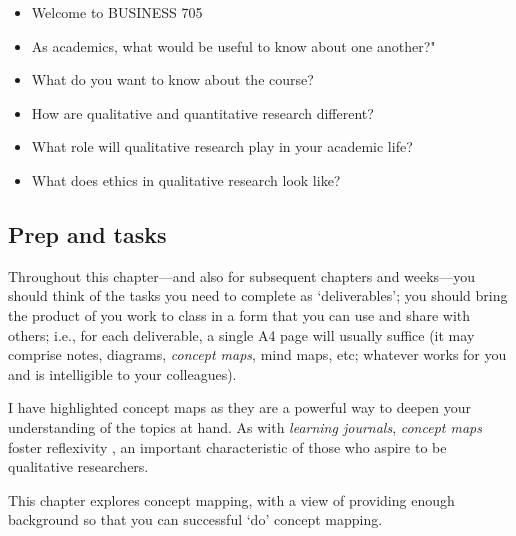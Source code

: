 \documentclass[]{book}
\theoremstyle{definition}
\theoremstyle{definition}
\theoremstyle{definition}
\theoremstyle{remark}
\begin{document}
\begin{itemize}
\item
  Welcome to BUSINESS 705
\item
  As academics, what would be useful to know about one another?"
\item
  What do you want to know about the course?
\item
  How are qualitative and quantitative research different?
\item
  What role will qualitative research play in your academic life?
\item
  What does ethics in qualitative research look like?
\end{itemize}

\hypertarget{prep-and-tasks}{%
\subsection*{Prep and tasks}\label{prep-and-tasks}}

Throughout this chapter---and also for subsequent chapters and
weeks---you should think of the tasks you need to complete as
`deliverables'; you should bring the product of you work to class in a
form that you can use and share with others; i.e., for each deliverable,
a single A4 page will usually suffice (it may comprise notes, diagrams,
\emph{concept maps}, mind maps, etc; whatever works for you and is
intelligible to your colleagues).

I have highlighted concept maps as they are a powerful way to deepen
your understanding of the topics at hand. As with \emph{learning
journals}, \emph{concept maps} foster reflexivity
\autocite{hibbert_2010_reflexivityrecursionrelationality}, an important
characteristic of those who aspire to be qualitative researchers.

This chapter explores concept mapping, with a view of providing enough
background so that you can successful `do' concept mapping.
\end{document}

